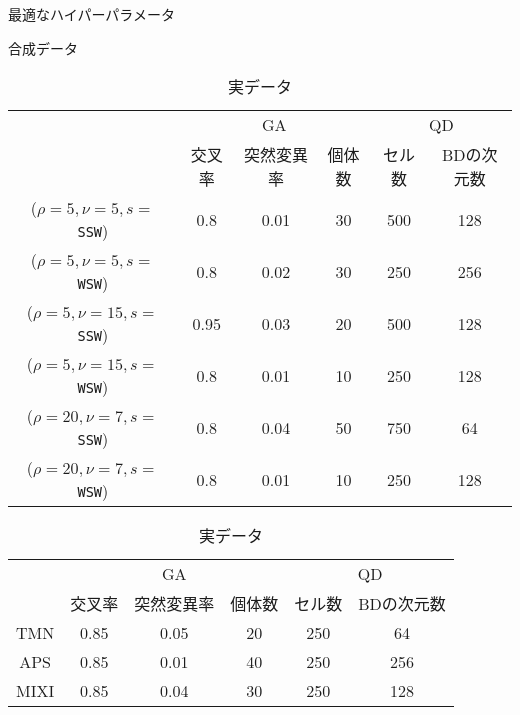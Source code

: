 \documentclass[uplatex,11pt,openany]{ujreport}
\begin{document}
        \begin{table}[htbp]
            \caption{最適なハイパーパラメータ}
            \label{tab:hyperparameter}
            \centering

            \begin{subtable}[h]{\textwidth}
                \centering
                \caption{合成データ}
                \begin{tabular}{c|ccc|cc}
                    \hline
                                            & \multicolumn{3}{c|}{GA} & \multicolumn{2}{c}{QD} \\
                                            & 交叉率    & 突然変異率  & 個体数  & セル数      & BDの次元数      \\  \hline
                    ($\rho=5,\nu=5,s=$\texttt{SSW})  & 0.8    & 0.01   & 30   & 500      & 128         \\
                    ($\rho=5,\nu=5,s=$\texttt{WSW})  & 0.8    & 0.02   & 30   & 250      & 256         \\
                    ($\rho=5,\nu=15,s=$\texttt{SSW}) & 0.95   & 0.03   & 20   & 500      & 128         \\
                    ($\rho=5,\nu=15,s=$\texttt{WSW}) & 0.8    & 0.01   & 10   & 250      & 128         \\
                    ($\rho=20,\nu=7,s=$\texttt{SSW}) & 0.8    & 0.04   & 50   & 750      & 64          \\
                    ($\rho=20,\nu=7,s=$\texttt{WSW}) & 0.8    & 0.01   & 10   & 250      & 128         \\ \hline
                \end{tabular}
            \end{subtable}

            \vspace{1zh}

            \begin{subtable}[h]{\textwidth}
                \centering
                \caption{実データ}
                \begin{tabular}{c|ccc|cc}
                    \hline
                        & \multicolumn{3}{c|}{GA} & \multicolumn{2}{c}{QD} \\
                        & 交叉率   & 突然変異率   & 個体数   & セル数      & BDの次元数      \\ \hline
                    TMN  & 0.85   & 0.05    & 20    & 250      & 64         \\
                    APS  & 0.85   & 0.01    & 40    & 250      & 256         \\
                    MIXI & 0.85   & 0.04    & 30    & 250      & 128         \\ \hline
                \end{tabular}
            \end{subtable}

        \end{table}
\end{document}
